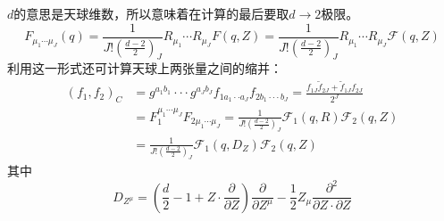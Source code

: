 $d$的意思是天球维数，所以意味着在计算的最后要取$d\to 2$极限。
\begin{equation}
	F_{\mu_{1}\cdots\mu_{J}}(q)=\frac{1}{J!\left(\frac{d-2}{2}\right)_{J}}R_{\mu_{1}}\cdots R_{\mu_{J}}F(q,Z)=\frac{1}{J!\left(\frac{d-2}{2}\right)_{J}}R_{\mu_{1}}\cdots R_{\mu_{J}}\mathcal{F}(q,Z)
\end{equation}
利用这一形式还可计算天球上两张量之间的缩并：
\begin{equation}
	\begin{aligned}
		(f_1,f_2)_C&=g^{a_1b_1}\cdotp\cdotp\cdotp g^{a_Jb_J}f_{1a_1\cdotp\cdotp a_J}f_{2b_1\cdotp\cdotp\cdotp b_J}=\frac{f_{1J}\tilde{f}_{2J}+\tilde{f}_{1J}f_{2J}}{2^J}\\
		&=F_{1}^{\mu_{1}\cdots\mu_{J}}F_{2\mu_{1}\cdots\mu_{J}}=\frac{1}{J!\left(\frac{d-2}{2}\right)_{J}}\mathcal{F}_{1}(q,R)\mathcal{F}_{2}(q,Z)\\
		&=\frac{1}{J!\left(\frac{d-2}{2}\right)_{J}}\mathcal{F}_{1}(q,D_Z)\mathcal{F}_{2}(q,Z)
	\end{aligned}
\end{equation}
其中
\[D_{Z^{\mu}}=\left(\frac{d}{2}-1+Z\cdot\frac{\partial}{\partial Z}\right)\frac{\partial}{\partial Z^{\mu}}-\frac{1}{2}Z_{\mu}\frac{\partial^{2}}{\partial Z\cdot\partial Z}\]
